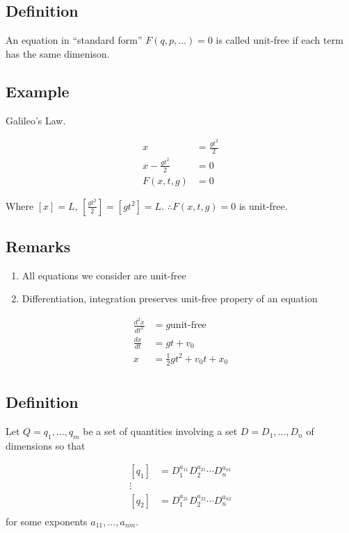 \documentclass[12pt]{article}
\begin{document}
\subsection{Definition}
An equation in ``standard form'' $F(q, p, \ldots) = 0$ is called unit-free if
each term has the same dimenison.

\subsection{Example}
Galileo's Law.

\begin{equation}
  \begin{aligned}
    x &= \frac{gt^2}{2} \\
    x - \frac{gt^2}{2} &= 0 \\
    F(x,t,g) &= 0
  \end{aligned}
\end{equation}

Where $[x] = L$, $[\frac{gt^2}{2}] = [gt^2] = L$.
$\therefore F(x,t,g)=0$ is unit-free.

\subsection{Remarks}
\begin{enumerate}
\item All equations we consider are unit-free
\item Differentiation, integration preserves unit-free propery of an equation
\end{enumerate}

\begin{equation}
  \begin{aligned}
    \frac{d^2x}{dt^2} &= g \text{unit-free} \\
    \frac{dx}{dt} &= gt + v_0 \\
    x &= \frac{1}{2}gt^2 + v_0 t + x_0 \\
  \end{aligned}
\end{equation}

\subsection{Definition}
Let $Q = {q_1, \ldots, q_m}$ be a set of quantities involving a set $D =
{D_1,\ldots,D_n}$ of dimensions so that

\begin{equation}
  \begin{aligned}
    [q_1] &= D_1^{a_{11}} D_2^{a_{21}}\cdots D_n^{a_{n1}} \\
    \vdots & \\
    [q_2] &= D_1^{a_{21}} D_2^{a_{22}}\cdots D_n^{a_{n2}} \\
  \end{aligned}
\end{equation}
for some exponents $a_{11}, \ldots, a_{nm}$.
\end{document}
